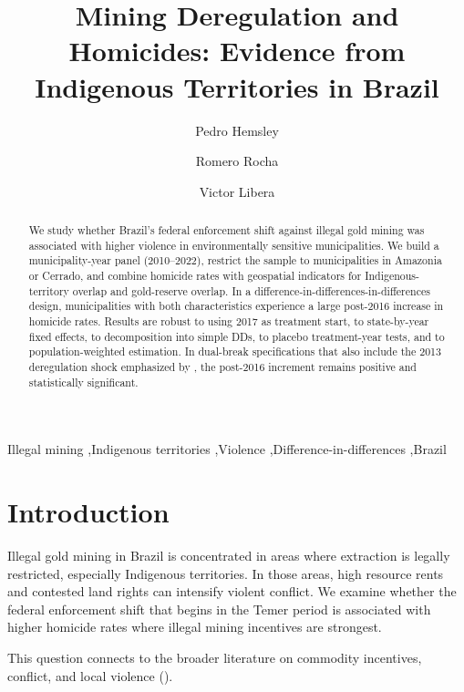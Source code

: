 \documentclass[preprint,12pt]{elsarticle}
\begin{document}
\begin{frontmatter}

\title{Mining Deregulation and Homicides: Evidence from Indigenous Territories in Brazil}

\author[u1]{Pedro Hemsley}
\author[u1]{Romero Rocha}
\author[u2]{Victor Libera}
\address[u1]{Universidade Federal do Rio de Janeiro, Brazil}
\address[u2]{Banco Nacional de Desenvolvimento Economico e Social (BNDES), Brazil}

\begin{abstract}
We study whether Brazil's federal enforcement shift against illegal gold mining was associated with higher violence in environmentally sensitive municipalities. We build a municipality-year panel (2010--2022), restrict the sample to municipalities in Amazonia or Cerrado, and combine homicide rates with geospatial indicators for Indigenous-territory overlap and gold-reserve overlap. In a difference-in-differences-in-differences design, municipalities with both characteristics experience a large post-2016 increase in homicide rates. Results are robust to using 2017 as treatment start, to state-by-year fixed effects, to decomposition into simple DDs, to placebo treatment-year tests, and to population-weighted estimation. In dual-break specifications that also include the 2013 deregulation shock emphasized by \citealp{pereira_pucci_2024}, the post-2016 increment remains positive and statistically significant.
\end{abstract}

\begin{keyword}
Illegal mining \sep Indigenous territories \sep Violence \sep Difference-in-differences \sep Brazil
\end{keyword}

\end{frontmatter}

\section{Introduction}
Illegal gold mining in Brazil is concentrated in areas where extraction is legally restricted, especially Indigenous territories. In those areas, high resource rents and contested land rights can intensify violent conflict. We examine whether the federal enforcement shift that begins in the Temer period is associated with higher homicide rates where illegal mining incentives are strongest.

This question connects to the broader literature on commodity incentives, conflict, and local violence (\citealp{dube2013commodity,fetzer2017property,moreno2024technical,falcone2022modernization}).
\end{document}

